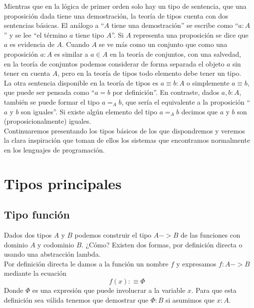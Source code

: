 Mientras que en la lógica de primer orden solo hay un tipo de sentencia, que una proposición dada tiene una demostración, la teoría de tipos cuenta con dos sentencias básicas. El análogo a ``$A$ tiene una demostración'' se escribe como ``$a : A$'' y se lee ``el término $a$ tiene tipo $A$''. Si $A$ representa una proposición se dice que $a$ es evidencia de $A$. Cuando $A$ se ve más como un conjunto que como una proposición $a:A$ es similar a $a \in A$ en la teoría de conjuntos, con una salvedad, en la teoría de conjuntos podemos considerar de forma separada el objeto $a$ sin tener en cuenta $A$, pero en la teoría de tipos todo elemento debe tener un tipo.\\

La otra sentencia disponible en la teoría de tipos es $a \equiv b : A$ o simplemente $a \equiv b$, que puede ser pensada como ``$a = b$ por definición''. En contraste, dados $a, b : A$, también se puede formar el tipo $a =_A b$, que sería el equivalente a la proposición ``$a$ y $b$ son iguales''. Si existe algún elemento del tipo $a =_A b$ decimos que $a$ y $b$ son (proposicionalmente) iguales.\\

Continuaremos presentando los tipos básicos de los que dispondremos y veremos la clara inspiración que toman de ellos los sistemas que encontramos normalmente en los lenguajes de programación.\\

\section{Tipos principales}

\subsection{Tipo función}

Dados dos tipos $A$ y $B$ podemos construir el tipo $A -> B$ de las funciones con dominio $A$ y codominio $B$. ¿Cómo? Existen dos formas, por definición directa o usando una abstracción lambda.\\

Por definición directa le damos a la función un nombre $f$ y expresamos $f : A -> B$ mediante la ecuación
$$f(x) :\equiv \Phi$$
Donde $\Phi$ es una expresión que puede involucrar a la variable $x$. Para que esta definición sea válida tenemos que demostrar que $\Phi:B$ si asumimos que $x:A$.\\

